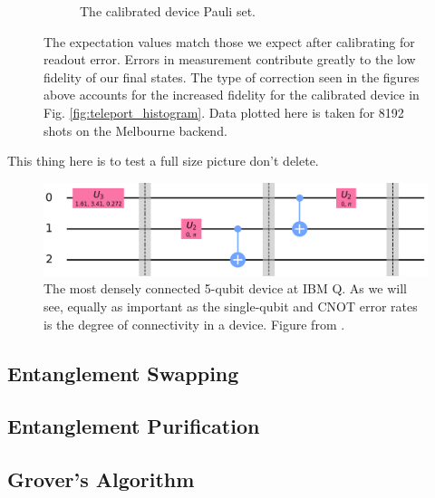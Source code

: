 \begin{figure}
\begin{subfigure}{.5\textwidth}
    \caption{The calibrated device Pauli set.}
    \label{fig:tele_pauli_dev}
  \end{subfigure}
  \caption{The expectation values match those we expect after calibrating for
readout error. Errors in measurement contribute greatly to the low fidelity of
our final states. The type of correction seen in the figures above accounts for
the increased fidelity for the calibrated device in Fig.
\ref{fig:teleport_histogram}. Data plotted here is taken for 8192 shots on the
Melbourne backend.}
  \label{fig:tele_paulis}
\end{figure}


This thing here is to test a full size picture don't delete.
\begin{figure}
  \centering
  \includegraphics[width=\textwidth]{images/teleport_ibmqx2.png}
  \caption{The most densely connected 5-qubit device at IBM Q. As we will see,
    equally as important as the single-qubit and CNOT error rates is the degree of
    connectivity in a device. Figure from \cite{ibmq_yorktown}.}
  \label{fig:yorktown_connections}
\end{figure}



\subsection{Entanglement Swapping}
\subsection{Entanglement Purification}
\subsection{Grover's Algorithm}



